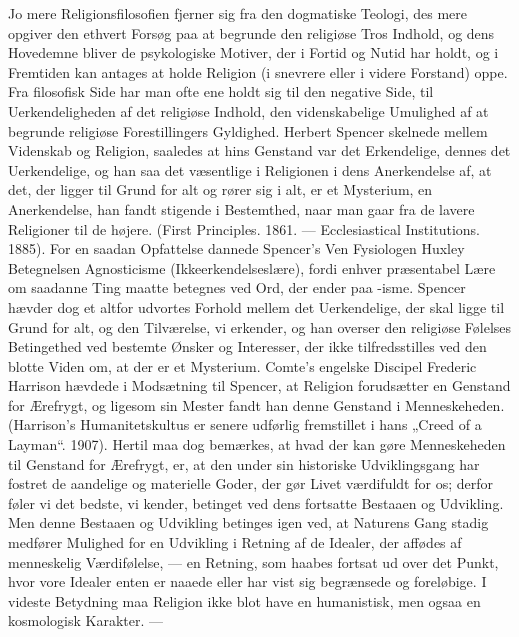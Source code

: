 \documentclass[12pt,a4paper,openany]{book}
\newcommand{\opage}[1]{\marginnote{\footnotesize\textit{[#1]}}}
\begin{document}
Jo mere Religionsfilosofien fjerner sig fra den dogmatiske Teologi,
des mere opgiver den ethvert Forsøg paa at begrunde den religiøse
Tros Indhold, og dens Hovedemne bliver de psykologiske Motiver,
der i Fortid og Nutid har holdt, og i Fremtiden kan antages at holde
Religion (i snevrere eller i videre Forstand) oppe. Fra filosofisk Side
har man ofte ene holdt sig til den negative Side, til Uerkendeligheden
af det religiøse Indhold, den videnskabelige Umulighed af at begrunde
religiøse Forestillingers Gyldighed. Herbert Spencer skelnede
mellem Videnskab og Religion, saaledes at hins Genstand var det
Erkendelige, dennes det Uerkendelige, og han saa det væsentlige i
Religionen i dens Anerkendelse af, at det, der ligger til Grund for alt
og rører sig i alt, er et Mysterium, en Anerkendelse, han fandt stigende
i Bestemthed, naar man gaar fra de lavere Religioner til de
højere. (First Principles. 1861. --- Ecclesiastical Institutions. 1885).
\opage{135}For en saadan Opfattelse dannede Spencer’s Ven Fysiologen Huxley
Betegnelsen Agnosticisme (Ikkeerkendelseslære), fordi enhver præsentabel
Lære om saadanne Ting maatte betegnes ved Ord, der ender
paa -isme. Spencer hævder dog et altfor udvortes Forhold mellem
det Uerkendelige, der skal ligge til Grund for alt, og den Tilværelse,
vi erkender, og han overser den religiøse Følelses Betingethed ved
bestemte Ønsker og Interesser, der ikke tilfredsstilles ved den blotte
Viden om, at der er et Mysterium. Comte’s engelske Discipel Frederic
Harrison hævdede i Modsætning til Spencer, at Religion forudsætter
en Genstand for Ærefrygt, og ligesom sin Mester fandt han
denne Genstand i Menneskeheden. (Harrison’s Humanitetskultus er
senere udførlig fremstillet i hans „Creed of a Layman“. 1907). Hertil
maa dog bemærkes, at hvad der kan gøre Menneskeheden til Genstand
for Ærefrygt, er, at den under sin historiske Udviklingsgang har
fostret de aandelige og materielle Goder, der gør Livet værdifuldt
for os; derfor føler vi det bedste, vi kender, betinget ved dens fortsatte
Bestaaen og Udvikling. Men denne Bestaaen og Udvikling betinges
igen ved, at Naturens Gang stadig medfører Mulighed for en
Udvikling i Retning af de Idealer, der affødes af menneskelig Værdifølelse,
--- en Retning, som haabes fortsat ud over det Punkt, hvor
vore Idealer enten er naaede eller har vist sig begrænsede og foreløbige.
I videste Betydning maa Religion ikke blot have en humanistisk,
men ogsaa en kosmologisk Karakter. ---
\end{document}
